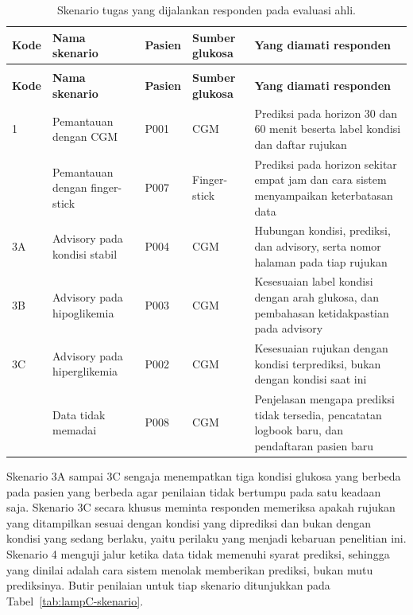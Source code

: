 \begingroup
\setlength{\LTcapwidth}{\textwidth}
\small
\captionsetup{font=normalsize}
\setlength{\tabcolsep}{4pt}
\begin{longtable}{@{}>{\raggedright\arraybackslash}p{1.300cm}>{\raggedright\arraybackslash}p{3.300cm}>{\raggedright\arraybackslash}p{1.500cm}>{\raggedright\arraybackslash}p{2.100cm}>{\raggedright\arraybackslash}p{4.675cm}@{}}
\caption{Skenario tugas yang dijalankan responden pada evaluasi ahli.}
\label{tab:lampC-skenario-tugas} \\
\toprule
\textbf{Kode} & \textbf{Nama skenario} & \textbf{Pasien} & \textbf{Sumber glukosa} & \textbf{Yang diamati responden} \\
\midrule
\endfirsthead

\multicolumn{5}{@{}l}{\small\emph{Tabel \thetable{} (lanjutan)}} \\
\toprule
\textbf{Kode} & \textbf{Nama skenario} & \textbf{Pasien} & \textbf{Sumber glukosa} & \textbf{Yang diamati responden} \\
\midrule
\endhead

\bottomrule
\endlastfoot

1 & Pemantauan dengan CGM & P001 & CGM & Prediksi pada horizon 30 dan 60 menit beserta label kondisi dan daftar rujukan \\

2 & Pemantauan dengan finger-stick & P007 & Finger-stick & Prediksi pada horizon sekitar empat jam dan cara sistem menyampaikan keterbatasan data \\

3A & Advisory pada kondisi stabil & P004 & CGM & Hubungan kondisi, prediksi, dan advisory, serta nomor halaman pada tiap rujukan \\

3B & Advisory pada hipoglikemia & P003 & CGM & Kesesuaian label kondisi dengan arah glukosa, dan pembahasan ketidakpastian pada advisory \\

3C & Advisory pada hiperglikemia & P002 & CGM & Kesesuaian rujukan dengan kondisi terprediksi, bukan dengan kondisi saat ini \\

4 & Data tidak memadai & P008 & CGM & Penjelasan mengapa prediksi tidak tersedia, pencatatan logbook baru, dan pendaftaran pasien baru \\
\end{longtable}
\endgroup

Skenario 3A sampai 3C sengaja menempatkan tiga kondisi glukosa yang berbeda pada pasien yang berbeda agar penilaian tidak bertumpu pada satu keadaan saja. Skenario
3C secara khusus meminta responden memeriksa apakah rujukan yang ditampilkan sesuai dengan kondisi yang diprediksi dan bukan dengan kondisi yang sedang berlaku,
yaitu perilaku yang menjadi kebaruan penelitian ini. Skenario 4 menguji jalur ketika data tidak memenuhi syarat prediksi, sehingga yang dinilai adalah cara sistem
menolak memberikan prediksi, bukan mutu prediksinya. Butir penilaian untuk tiap skenario ditunjukkan pada Tabel~\ref{tab:lampC-skenario}.


